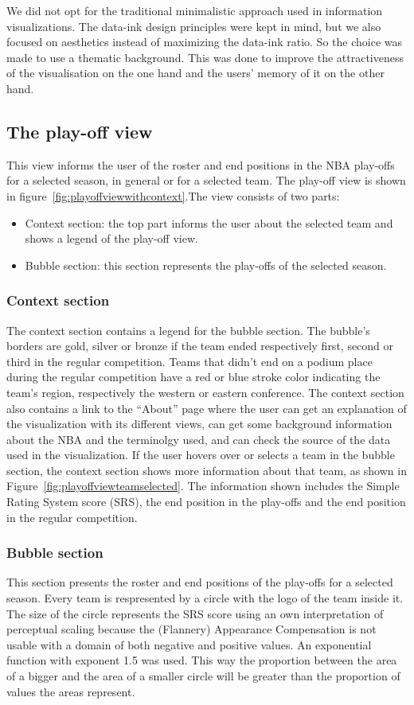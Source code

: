\documentclass[chi_draft]{sigchi}
\begin{document}
We did not opt for the traditional minimalistic approach used in information 
visualizations. The data-ink design principles were kept in mind, but we also 
focused on aesthetics instead of maximizing the data-ink ratio. So the choice 
was made to use a thematic background. This was done to improve the 
attractiveness of the visualisation on the one hand and the users' memory of 
it on the other hand\cite{aesthetics}. 

\subsection{The play-off view}
This view informs the user of the roster and end positions in the NBA play-offs
for a selected season, in general or for a selected team. The play-off view is 
shown in figure~\ref{fig:playoffviewwithcontext}.The view consists of
two parts: 
\begin{itemize}
    \item Context section: the top part informs the user about the selected team
    and shows a legend of the play-off view.
    \item Bubble section: this section represents the play-offs of the selected
    season.
\end{itemize}

\subsubsection{Context section}
The context section contains a legend for the bubble section. The bubble's
borders are gold, silver or bronze if the team ended respectively first, second
or third in the regular competition. Teams that didn't end on a podium place
during the regular competition have a red or blue stroke color indicating the
team's region, respectively the western or eastern conference. The context
section also contains a link to the ``About'' page where the user can get an
explanation of the visualization with its different views, can get some
background information about the NBA and the terminolgy used, and can check the
source of the data used in the visualization. If the user hovers over or selects 
a team in the bubble section, the context section shows more information about that 
team, as shown in Figure~\ref{fig:playoffviewteamselected}. The information shown 
includes the Simple Rating System score (SRS), the end position in the play-offs 
and the end position in the regular competition.

\subsubsection{Bubble section}
This section presents the roster and end positions of the play-offs for a
selected season. Every team is respresented by a circle with the logo of the
team inside it. The size of the circle represents the SRS score using an own
interpretation of perceptual scaling because the (Flannery) Appearance
Compensation is not usable with a domain of both negative and positive values.
An exponential function with exponent 1.5 was used. This way the proportion
between the area of a bigger and the area of a smaller circle will be greater
than the proportion of values the areas represent.
\end{document}
